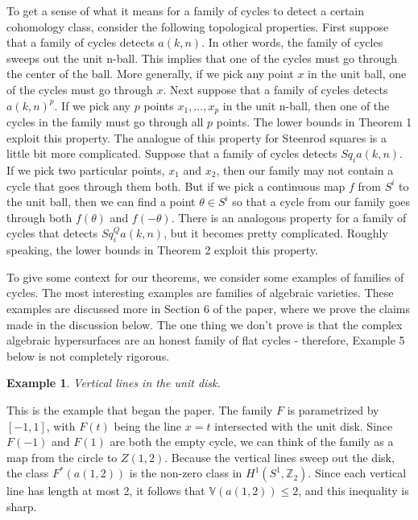 \documentclass{amsart}
\newtheorem*{Theorem 1}{Theorem 1}
\newtheorem*{Theorem 2}{Theorem 2}
\newtheorem*{Theorem 1A}{Theorem 1A}
\newtheorem*{Theorem 2A}{Theorem 2A}
\newtheorem{introexample}{Example}
\newtheorem*{vanishing lemma}{Vanishing Lemma}
\numberwithin{equation}{section}
\begin{document}
To get a sense of what it means for a family of cycles to detect
a certain cohomology class, consider the following topological
properties.  First suppose that a family of cycles detects $a(k,n)$.  In other
words, the family of cycles sweeps out the unit n-ball.  This implies that
one of the cycles must go through the center of the ball.  More
generally, if we pick any point $x$ in the unit ball, one of the cycles
must go through $x$.  Next suppose that a family of cycles detects $a(k,n)^p$.  If
we pick any $p$ points $x_1, ..., x_p$ in the unit n-ball, then one
of the cycles in the family must go through all $p$ points.  The lower
bounds in Theorem 1 exploit this property.  The analogue of this property
for Steenrod squares is a little bit more complicated.  Suppose that a family of 
cycles detects $Sq_i a(k,n)$.  If we pick two particular points, $x_1$ and $x_2$, 
then our family may not contain a cycle that goes through
them both.  But if
we pick a continuous map $f$ from $S^i$ to the unit ball, then we
can find a point $\theta \in S^i$ so that a cycle from our family 
goes through both $f(\theta)$ and $f(- \theta)$.  There is
an analogous property for a family of cycles that detects $Sq_i^Q a(k,n)$,
but it becomes pretty complicated.  Roughly speaking, the lower bounds
in Theorem 2 exploit this property.

To give some context for our theorems, we consider some examples
of families of cycles.  The most interesting examples are families
of algebraic varieties.  These examples are discussed more in
Section 6 of the paper, where we prove the claims made in the
discussion below.  The one thing we don't prove is that the complex
algebraic hypersurfaces are an honest family of flat cycles - therefore,
Example 5 below is not completely rigorous.

\begin{introexample} Vertical lines in the unit disk.  
\end{introexample}

This is the example that began the paper.  The family $F$ is
parametrized by $[-1,1]$, with $F(t)$ being the line $x=t$
intersected with the unit disk.  Since $F(-1)$ and $F(1)$ are
both the empty cycle, we can think of the family as a map from
the circle to $Z(1,2)$.  Because the vertical lines sweep out the
disk, the class $F^*(a(1,2))$ is the non-zero class in $H^1(S^1,
\mathbb{Z}_2)$.  Since each vertical line has length at most 2,
it follows that $\mathbb{V}(a(1,2)) \le 2$, and this inequality
is sharp.
\end{document}
